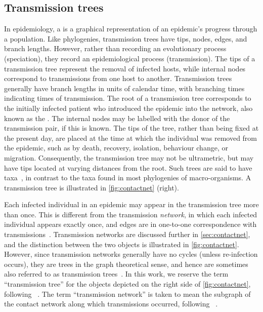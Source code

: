 \subsection{Transmission trees}

In epidemiology, a  is a graphical representation of an
epidemic's progress through a population. Like phylogenies, transmission trees
have tips, nodes, edges, and branch lengths. However, rather than recording an
evolutionary process (speciation), they record an epidemiological process
(transmission). The tips of a transmission tree represent the removal of
infected hosts, while internal nodes correspond to transmissions from one host
to another. Transmission trees generally have branch lengths in units of
calendar time, with branching times indicating times of transmission. The root
of a transmission tree corresponds to the initially infected patient who
introduced the epidemic into the network, also known as the .
The internal nodes may be labelled with the donor of the transmission pair, if
this is known. The tips of the tree, rather than being fixed at the present
day, are placed at the time at which the individual was removed from the
epidemic, such as by death, recovery, isolation, behaviour change, or
migration. Consequently, the transmission tree may not be ultrametric, but may
have tips located at varying distances from the root. Such trees are said to
have  taxa~\autocite{drummond2003measurably}, in contrast
to the  taxa found in most phylogenies of macro-organisms. A
transmission tree is illustrated in \cref{fig:contactnet} (right). 

Each infected individual in an epidemic may appear in the transmission tree
more than once. This is different from the transmission \emph{network}, in
which each infected individual appears exactly once, and edges are in
one-to-one correspondence with transmissions~\autocite{welch2011statistical,
keeling2005networks}. Transmission networks are discussed further in
\cref{sec:contactnet}, and the distinction between the two objects is
illustrated in \cref{fig:contactnet}. However, since transmission networks
generally have no cycles (unless re-infection occurs), they are trees in the
graph theoretical sense, and hence are sometimes also referred to as
transmission trees~\autocite[\eg][]{kenah2015algorithms}. In this work, we
reserve the term ``transmission tree'' for the objects depicted on the right
side of \cref{fig:contactnet}, following \eg~\autocite{stadler2013uncovering}.
The term ``transmission network'' is taken to mean the subgraph of the contact
network along which transmissions occurred, following
\eg~\autocite{welch2011statistical, keeling2005networks}.

